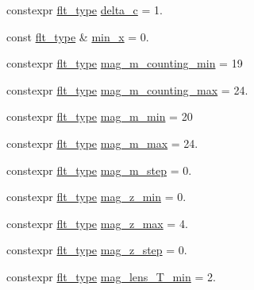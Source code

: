 \begin{DoxyCompactItemize}
\item 
constexpr \hyperlink{lib_2IceBRG__main_2common_8h_ad0f130a56eeb944d9ef2692ee881ecc4}{flt\+\_\+type} \hyperlink{namespaceIceBRG_a7ec2b20e0b731b6392e5779857559ba2}{delta\+\_\+c} = 1.
\item 
const \hyperlink{lib_2IceBRG__main_2common_8h_ad0f130a56eeb944d9ef2692ee881ecc4}{flt\+\_\+type} \& \hyperlink{namespaceIceBRG_a2669894c97834b30c36e7a378a161fda}{min\+\_\+x} = 0.
\item 
constexpr \hyperlink{lib_2IceBRG__main_2common_8h_ad0f130a56eeb944d9ef2692ee881ecc4}{flt\+\_\+type} \hyperlink{namespaceIceBRG_a94be0eaeb0bfcdc8dae4a1aa020b5e60}{mag\+\_\+m\+\_\+counting\+\_\+min} = 19
\item 
constexpr \hyperlink{lib_2IceBRG__main_2common_8h_ad0f130a56eeb944d9ef2692ee881ecc4}{flt\+\_\+type} \hyperlink{namespaceIceBRG_ac6de07edf41f9e5c1c7e8c5f1689f17c}{mag\+\_\+m\+\_\+counting\+\_\+max} = 24.
\item 
constexpr \hyperlink{lib_2IceBRG__main_2common_8h_ad0f130a56eeb944d9ef2692ee881ecc4}{flt\+\_\+type} \hyperlink{namespaceIceBRG_af21cb728e53beb5bc6bf61e06d466535}{mag\+\_\+m\+\_\+min} = 20
\item 
constexpr \hyperlink{lib_2IceBRG__main_2common_8h_ad0f130a56eeb944d9ef2692ee881ecc4}{flt\+\_\+type} \hyperlink{namespaceIceBRG_afe312c946480f9d2fa951168035a3a09}{mag\+\_\+m\+\_\+max} = 24.
\item 
constexpr \hyperlink{lib_2IceBRG__main_2common_8h_ad0f130a56eeb944d9ef2692ee881ecc4}{flt\+\_\+type} \hyperlink{namespaceIceBRG_a0dc0ffd6663af1f01df1e07c25556a13}{mag\+\_\+m\+\_\+step} = 0.
\item 
constexpr \hyperlink{lib_2IceBRG__main_2common_8h_ad0f130a56eeb944d9ef2692ee881ecc4}{flt\+\_\+type} \hyperlink{namespaceIceBRG_ad984585cf2116d7dba1d297d6fa7d3f1}{mag\+\_\+z\+\_\+min} = 0.
\item 
constexpr \hyperlink{lib_2IceBRG__main_2common_8h_ad0f130a56eeb944d9ef2692ee881ecc4}{flt\+\_\+type} \hyperlink{namespaceIceBRG_ac405728ac8f0dd2dc9ef8e4e332c48a2}{mag\+\_\+z\+\_\+max} = 4.
\item 
constexpr \hyperlink{lib_2IceBRG__main_2common_8h_ad0f130a56eeb944d9ef2692ee881ecc4}{flt\+\_\+type} \hyperlink{namespaceIceBRG_a1394dcf9ab9fe4a99d8315787e81a2eb}{mag\+\_\+z\+\_\+step} = 0.
\item 
constexpr \hyperlink{lib_2IceBRG__main_2common_8h_ad0f130a56eeb944d9ef2692ee881ecc4}{flt\+\_\+type} \hyperlink{namespaceIceBRG_ac8678d1f61a28341bc7157159256bb3b}{mag\+\_\+lens\+\_\+\+T\+\_\+min} = 2.

\end{DoxyCompactItemize}
